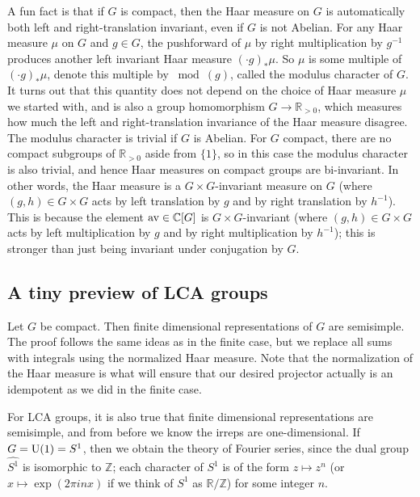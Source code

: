 \documentclass[../../rtnotes.tex]{subfiles}
\begin{document}
A fun fact is that if $G$ is compact, then the Haar measure on $G$ is automatically both left and right-translation invariant, even if $G$ is not Abelian. For any Haar measure $\mu$ on $G$ and $g\in G$, the pushforward of $\mu$ by right multiplication by $g^{-1}$ produces another left invariant Haar measure $(\cdot g)_\ast\mu$. So $\mu$ is some multiple of $(\cdot g)_\ast\mu$, denote this multiple by $\bmod(g)$, called the modulus character of $G$. It turns out that this quantity does not depend on the choice of Haar measure $\mu$ we started with, and is also a group homomorphism $G\to \mathbb R_{>0}$, which measures how much the left and right-translation invariance of the Haar measure disagree. The modulus character is trivial if $G$ is Abelian. For $G$ compact, there are no compact subgroups of $\mathbb R_{>0}$ aside from $\{1\}$, so in this case the modulus character is also trivial, and hence Haar measures on compact groups are bi-invariant. In other words, the Haar measure is a $G\times G$-invariant measure on $G$ (where $(g,h)\in G\times G$ acts by left translation by $g$ and by right translation by $h^{-1}$). This is because the element $\mathrm{av}\in\mathbb C[G]$ is $G\times G$-invariant (where $(g,h)\in G\times G$ acts by left multiplication by $g$ and by right multiplication by $h^{-1}$); this is stronger than just being invariant under conjugation by $G$.

\subsection{A tiny preview of LCA groups}
Let $G$ be compact. Then finite dimensional representations of $G$ are semisimple. The proof follows the same ideas as in the finite case, but we replace all sums with integrals using the normalized Haar measure. Note that the normalization of the Haar measure is what will ensure that our desired projector actually is an idempotent as we did in the finite case.

For LCA groups, it is also true that finite dimensional representations are semisimple, and from before we know the irreps are one-dimensional. If $G = \operatorname{U}(1) = S^1$, then we obtain the theory of Fourier series, since the dual group $\widehat{S^1}$ is isomorphic to $\mathbb Z$; each character of $S^1$ is of the form $z\mapsto z^n$ (or $x\mapsto \exp(2\pi i nx)$ if we think of $S^1$ as $\mathbb R/\mathbb Z$) for some integer $n$.
\end{document}
